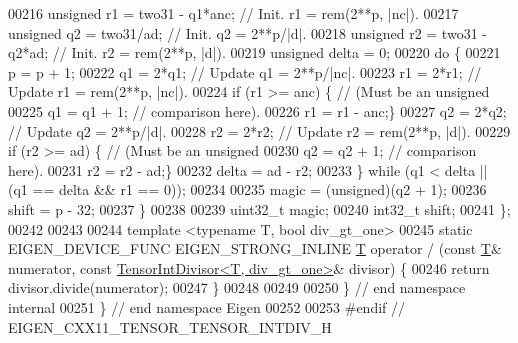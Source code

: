 \begin{DoxyCode}
00216    \textcolor{keywordtype}{unsigned} r1 = two31 - q1*anc;    \textcolor{comment}{// Init. r1 = rem(2**p, |nc|).}
00217    \textcolor{keywordtype}{unsigned} q2 = two31/ad;          \textcolor{comment}{// Init. q2 = 2**p/|d|.}
00218    \textcolor{keywordtype}{unsigned} r2 = two31 - q2*ad;     \textcolor{comment}{// Init. r2 = rem(2**p, |d|).}
00219    \textcolor{keywordtype}{unsigned} delta = 0;
00220    \textcolor{keywordflow}{do} \{
00221       p = p + 1;
00222       q1 = 2*q1;           \textcolor{comment}{// Update q1 = 2**p/|nc|.}
00223       r1 = 2*r1;           \textcolor{comment}{// Update r1 = rem(2**p, |nc|).}
00224       \textcolor{keywordflow}{if} (r1 >= anc) \{     \textcolor{comment}{// (Must be an unsigned}
00225          q1 = q1 + 1;      \textcolor{comment}{// comparison here).}
00226          r1 = r1 - anc;\}
00227       q2 = 2*q2;           \textcolor{comment}{// Update q2 = 2**p/|d|.}
00228       r2 = 2*r2;           \textcolor{comment}{// Update r2 = rem(2**p, |d|).}
00229       \textcolor{keywordflow}{if} (r2 >= ad) \{      \textcolor{comment}{// (Must be an unsigned}
00230          q2 = q2 + 1;      \textcolor{comment}{// comparison here).}
00231          r2 = r2 - ad;\}
00232       delta = ad - r2;
00233    \} \textcolor{keywordflow}{while} (q1 < delta || (q1 == delta && r1 == 0));
00234 
00235    magic = (unsigned)(q2 + 1);
00236    shift = p - 32;
00237   \}
00238 
00239   uint32\_t magic;
00240   int32\_t shift;
00241 \};
00242 
00243 
00244 \textcolor{keyword}{template} <\textcolor{keyword}{typename} T, \textcolor{keywordtype}{bool} div\_gt\_one>
00245 \textcolor{keyword}{static} EIGEN\_DEVICE\_FUNC EIGEN\_STRONG\_INLINE \hyperlink{group___sparse_core___module}{T} operator / (\textcolor{keyword}{const} \hyperlink{group___sparse_core___module}{T}& numerator, \textcolor{keyword}{const} 
      \hyperlink{struct_eigen_1_1internal_1_1_tensor_int_divisor}{TensorIntDivisor<T, div\_gt\_one>}& divisor) \{
00246   \textcolor{keywordflow}{return} divisor.divide(numerator);
00247 \}
00248 
00249 
00250 \} \textcolor{comment}{// end namespace internal}
00251 \} \textcolor{comment}{// end namespace Eigen}
00252 
00253 \textcolor{preprocessor}{#endif // EIGEN\_CXX11\_TENSOR\_TENSOR\_INTDIV\_H}
\end{DoxyCode}
